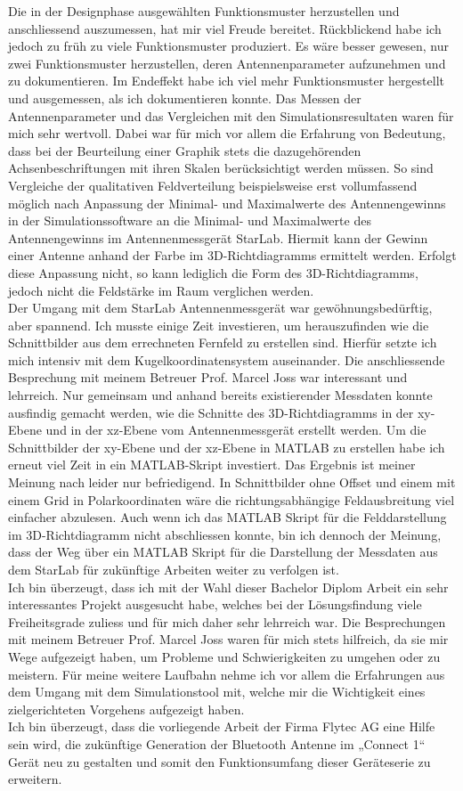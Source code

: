 Die in der Designphase ausgewählten Funktionsmuster herzustellen und anschliessend auszumessen, hat mir viel Freude bereitet. Rückblickend habe ich jedoch zu früh zu viele Funktionsmuster produziert. Es wäre besser gewesen, nur zwei Funktionsmuster herzustellen, deren Antennenparameter aufzunehmen und zu dokumentieren. Im Endeffekt habe ich viel mehr Funktionsmuster hergestellt und ausgemessen, als ich dokumentieren konnte.
Das Messen der Antennenparameter und das Vergleichen mit den Simulationsresultaten waren für mich sehr wertvoll. Dabei war für mich vor allem die Erfahrung von Bedeutung, dass bei der Beurteilung einer Graphik stets die dazugehörenden Achsenbeschriftungen mit ihren Skalen berücksichtigt werden müssen. So sind Vergleiche der qualitativen Feldverteilung beispielsweise erst vollumfassend möglich nach Anpassung der Minimal- und Maximalwerte des Antennengewinns in der Simulationssoftware an die Minimal- und Maximalwerte des Antennengewinns im Antennenmessgerät StarLab. Hiermit kann der Gewinn einer Antenne anhand der Farbe im 3D-Richtdiagramms ermittelt werden. Erfolgt diese Anpassung nicht, so kann lediglich die Form des 3D-Richtdiagramms, jedoch nicht die Feldstärke im Raum verglichen werden. \\
Der Umgang mit dem StarLab Antennenmessgerät war gewöhnungsbedürftig, aber spannend. Ich musste einige Zeit investieren, um herauszufinden wie die Schnittbilder aus dem errechneten Fernfeld zu erstellen sind. Hierfür setzte ich mich intensiv mit dem Kugelkoordinatensystem auseinander. Die anschliessende Besprechung mit meinem Betreuer Prof. Marcel Joss war interessant und lehrreich. Nur gemeinsam und anhand bereits existierender Messdaten konnte ausfindig gemacht werden, wie die Schnitte des 3D-Richtdiagramms in der xy-Ebene und in der xz-Ebene vom Antennenmessgerät erstellt werden. Um die Schnittbilder der xy-Ebene und der xz-Ebene in MATLAB zu erstellen habe ich erneut viel Zeit in ein MATLAB-Skript investiert. Das Ergebnis ist meiner Meinung nach leider nur befriedigend. In Schnittbilder ohne Offset und einem mit einem Grid in Polarkoordinaten wäre die richtungsabhängige Feldausbreitung viel einfacher abzulesen. Auch wenn ich das MATLAB Skript für die Felddarstellung im 3D-Richtdiagramm nicht abschliessen konnte, bin ich dennoch der Meinung, dass der Weg über ein MATLAB Skript für die Darstellung der Messdaten aus dem StarLab für zukünftige Arbeiten weiter zu verfolgen ist. \\  
Ich bin überzeugt, dass ich mit der Wahl dieser Bachelor Diplom Arbeit ein sehr interessantes Projekt ausgesucht habe, welches bei der Lösungsfindung viele Freiheitsgrade zuliess und für mich daher sehr lehrreich war. Die Besprechungen mit meinem Betreuer Prof. Marcel Joss waren für mich stets hilfreich, da sie mir Wege aufgezeigt haben, um Probleme und Schwierigkeiten zu umgehen oder zu meistern. Für meine weitere Laufbahn nehme ich vor allem die Erfahrungen aus dem Umgang mit dem Simulationstool mit, welche mir die Wichtigkeit eines zielgerichteten Vorgehens aufgezeigt haben.\\
Ich bin überzeugt, dass die vorliegende Arbeit der Firma Flytec AG eine Hilfe sein wird, die zukünftige Generation der Bluetooth Antenne im „Connect 1“ Gerät neu zu gestalten und somit den Funktionsumfang dieser Geräteserie zu erweitern.
